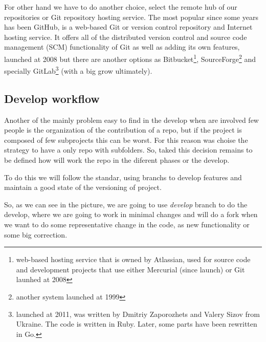 For other hand we have to do another choice, select the remote hub of our repositories
or Git repository hosting service. The most popular since some years has been GitHub,
is a web-based Git or version control repository and Internet hosting service.
It offers all of the distributed version control and source code management (SCM)
functionality of Git as well as adding its own features,
launched at 2008
but there are another options as Bitbucket\footnote{web-based hosting service
that is owned by Atlassian, used for source code and development projects that
use either Mercurial (since launch) or Git
launhed at 2008},
SourceForge\footnote{another system launched at 1999} and specially
GitLab\footnote{launched at 2011, was written by Dmitriy Zaporozhets and Valery
Sizov from Ukraine. The code is written in Ruby. Later, some parts have been
rewritten in Go.} (with a big grow ultimately).


\subsection{Develop workflow}

Another of the mainly problem easy to find in the develop when are involved
few people is the organization of the contribution of a repo, but if the project
is composed of few subprojects this can be worst. For this reason was choise the
strategy to have a only repo with subfolders.
So, taked this decision remains to be defined how will work the repo in the
diferent phases or the develop.

To do this we will follow the standar, using branchs to develop features and
maintain a good state of the versioning of project.

So, as we can see in the picture, we are going to use \textit{develop} branch
to do the develop, where we are going to work in minimal changes and will do
a fork when we want to do some representative change in the code, as new functionality or
some big correction.


